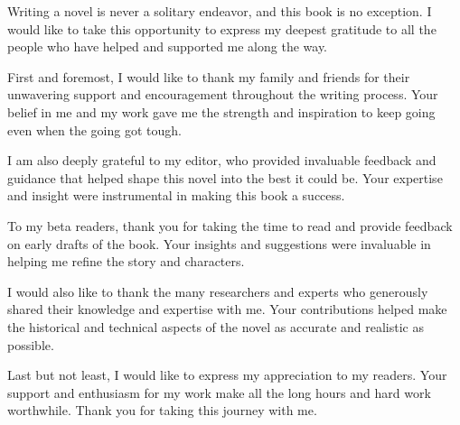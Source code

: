 Writing a novel is never a solitary endeavor, and this book is no exception. I would like to take this opportunity to express my deepest gratitude to all the people who have helped and supported me along the way.

First and foremost, I would like to thank my family and friends for their unwavering support and encouragement throughout the writing process. Your belief in me and my work gave me the strength and inspiration to keep going even when the going got tough.

I am also deeply grateful to my editor, who provided invaluable feedback and guidance that helped shape this novel into the best it could be. Your expertise and insight were instrumental in making this book a success.

To my beta readers, thank you for taking the time to read and provide feedback on early drafts of the book. Your insights and suggestions were invaluable in helping me refine the story and characters.

I would also like to thank the many researchers and experts who generously shared their knowledge and expertise with me. Your contributions helped make the historical and technical aspects of the novel as accurate and realistic as possible.

Last but not least, I would like to express my appreciation to my readers. Your support and enthusiasm for my work make all the long hours and hard work worthwhile. Thank you for taking this journey with me.

